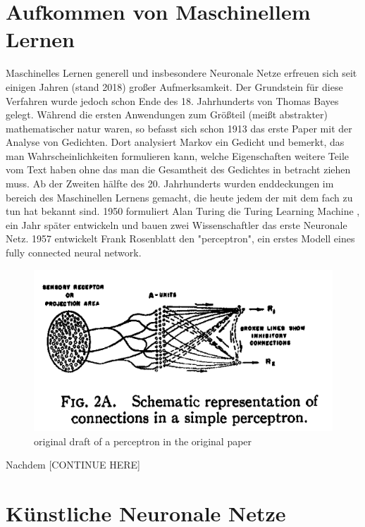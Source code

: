 \documentclass{thesisclass}
\begin{document}
\section{Aufkommen von Maschinellem Lernen}
Maschinelles Lernen generell und insbesondere Neuronale Netze erfreuen sich seit einigen Jahren (stand 2018) großer Aufmerksamkeit. Der Grundstein für diese Verfahren wurde jedoch schon Ende des 18. Jahrhunderts von Thomas Bayes gelegt\cite{bayes1763essay}. \newline
Während die ersten Anwendungen zum Größteil (meißt abstrakter) mathematischer natur waren\cite{legendre1805nouvelles}, so befasst sich schon 1913 das erste Paper mit der Analyse von Gedichten\cite{markov2006example}. Dort analysiert Markov ein Gedicht und bemerkt, das man Wahrscheinlichkeiten formulieren kann, welche Eigenschaften weitere Teile vom Text haben ohne das man die Gesamtheit des Gedichtes in betracht ziehen muss. \newline
Ab der Zweiten hälfte des 20. Jahrhunderts wurden enddeckungen im bereich des Maschinellen Lernens gemacht, die heute jedem der mit dem fach zu tun hat bekannt sind. 1950 formuliert Alan Turing die Turing Learning Machine \cite{machinery1950computing}, ein Jahr später entwickeln und bauen zwei Wissenschaftler das erste Neuronale Netz\cite{snarc}. 1957 entwickelt Frank Rosenblatt den "perceptron"\cite{rosenblatt1958perceptron}, ein erstes Modell eines fully connected neural network.
\begin{figure}[H]
  \center
  \includegraphics[width=\textwidth]{images/perceptron.png}
  \caption{original draft of a perceptron in the original paper}
  \label{fig:perceptron}
\end{figure}
Nachdem [CONTINUE HERE]

\section{Künstliche Neuronale Netze}
\end{document}

